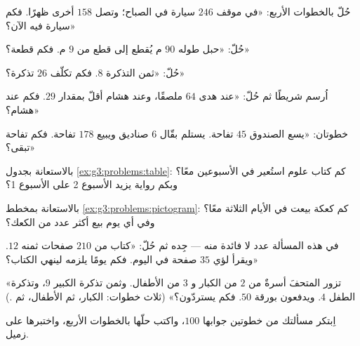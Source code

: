 \begin{exercise}[$\star$]\label{exo:g3:problems:2}
حُلّ بالخطوات الأربع: «في موقف $246$ سيارة في الصباح؛
وتصل $158$ أخرى ظهرًا. فكم سيارة فيه الآن؟»
\end{exercise}

\begin{exercise}[$\star$]\label{exo:g3:problems:3}
حُلّ: «حبل طوله $90$ م يُقطع إلى قطع من $9$ م. فكم
قطعة؟»
\end{exercise}

\begin{exercise}[$\star$]\label{exo:g3:problems:4}
حُلّ: «ثمن التذكرة $8$. فكم تكلّف $26$ تذكرة؟»
\end{exercise}

\begin{exercise}[$\star$]\label{exo:g3:problems:5}
اُرسم شريطًا ثم حُلّ: «عند هدى $64$ ملصقًا، وعند هشام أقلّ
بمقدار $29$. فكم عند هشام؟»
\end{exercise}

\begin{exercise}[$\star$]\label{exo:g3:problems:6}
خطوتان: «يسع الصندوق $45$ تفاحة. يستلم بقّال $6$ صناديق
ويبيع $178$ تفاحة. فكم تفاحة تبقى؟»
\end{exercise}

\begin{exercise}[$\star$]\label{exo:g3:problems:7}
بالاستعانة بجدول \cref{ex:g3:problems:table}: كم كتاب علوم
استُعير في الأسبوعين معًا؟ وبكم رواية يزيد الأسبوع 2 على
الأسبوع 1؟
\end{exercise}

\begin{exercise}[$\star$]\label{exo:g3:problems:8}
بالاستعانة بمخطط \cref{ex:g3:problems:pictogram}: كم كعكة
بيعت في الأيام الثلاثة معًا؟ وفي أي يوم بيع أكثر عدد من
الكعك؟
\end{exercise}

\begin{exercise}[$\star$]\label{exo:g3:problems:9}
في هذه المسألة عدد لا فائدة منه --- جِده ثم حُلّ: «كتاب من
$210$ صفحات ثمنه $12$. ويقرأ لؤي $35$ صفحة في اليوم. فكم يومًا
يلزمه لينهي الكتاب؟»
\end{exercise}

\begin{exercise}[$\star\star$]\label{exo:g3:problems:10}
«تزور المتحفَ أسرةٌ من $2$ من الكبار و $3$ من الأطفال. وثمن
تذكرة الكبير $9$، وتذكرة الطفل $4$. ويدفعون بورقة $50$.
فكم يستردّون؟» (ثلاث خطوات: الكبار، ثم الأطفال، ثم
.)
\end{exercise}

\begin{exercise}[$\star\star$]\label{exo:g3:problems:11}
اِبتكر مسألتك من خطوتين جوابها $100$، واكتب حلّها
بالخطوات الأربع، واختبرها على زميل.
\end{exercise}
